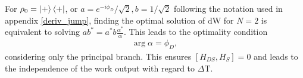 For $\rho_0 = \ket{+} \bra{+}$, or $a = e^{-i \phi_D}/\sqrt{2}, b = 1/\sqrt{2}$ following the notation used in appendix \ref{deriv_jump}, finding the optimal solution of $\mathrm{dW}$ for $N = 2$ is equivalent to solving $a b^* = a^* b \frac{\alpha^*}{\alpha}$.
This leads to the optimality condition
\begin{align}\label{opt_cond}
	\arg{\alpha} = \phi_D,
\end{align}
considering only the principal branch. This ensures $[H_{DS}, H_S] = 0$ and leads to the independence of the work output with regard to $\Delta \mathrm{T}$. 
